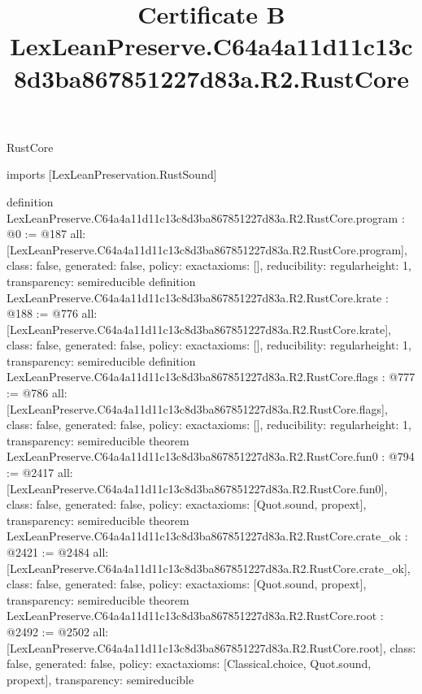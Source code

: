 \begin{lexlean}{RustCore}
\title{Certificate B LexLeanPreserve.C64a4a11d11c13c8d3ba867851227d83a.R2.RustCore}
\begin{coremodule}
imports [LexLeanPreservation.RustSound]

definition LexLeanPreserve.C64a4a11d11c13c8d3ba867851227d83a.R2.RustCore.program : @0 := @187 {
  all: [LexLeanPreserve.C64a4a11d11c13c8d3ba867851227d83a.R2.RustCore.program],
  class: false,
  generated: false,
  policy: exact{axioms: []},
  reducibility: regular{height: 1},
  transparency: semireducible
}
definition LexLeanPreserve.C64a4a11d11c13c8d3ba867851227d83a.R2.RustCore.krate : @188 := @776 {
  all: [LexLeanPreserve.C64a4a11d11c13c8d3ba867851227d83a.R2.RustCore.krate],
  class: false,
  generated: false,
  policy: exact{axioms: []},
  reducibility: regular{height: 1},
  transparency: semireducible
}
definition LexLeanPreserve.C64a4a11d11c13c8d3ba867851227d83a.R2.RustCore.flags : @777 := @786 {
  all: [LexLeanPreserve.C64a4a11d11c13c8d3ba867851227d83a.R2.RustCore.flags],
  class: false,
  generated: false,
  policy: exact{axioms: []},
  reducibility: regular{height: 1},
  transparency: semireducible
}
theorem LexLeanPreserve.C64a4a11d11c13c8d3ba867851227d83a.R2.RustCore.fun0 : @794 := @2417 {
  all: [LexLeanPreserve.C64a4a11d11c13c8d3ba867851227d83a.R2.RustCore.fun0],
  class: false,
  generated: false,
  policy: exact{axioms: [Quot.sound, propext]},
  transparency: semireducible
}
theorem LexLeanPreserve.C64a4a11d11c13c8d3ba867851227d83a.R2.RustCore.crate_ok : @2421 := @2484 {
  all: [LexLeanPreserve.C64a4a11d11c13c8d3ba867851227d83a.R2.RustCore.crate_ok],
  class: false,
  generated: false,
  policy: exact{axioms: [Quot.sound, propext]},
  transparency: semireducible
}
theorem LexLeanPreserve.C64a4a11d11c13c8d3ba867851227d83a.R2.RustCore.root : @2492 := @2502 {
  all: [LexLeanPreserve.C64a4a11d11c13c8d3ba867851227d83a.R2.RustCore.root],
  class: false,
  generated: false,
  policy: exact{axioms: [Classical.choice, Quot.sound, propext]},
  transparency: semireducible
}


\end{coremodule}
\end{lexlean}
